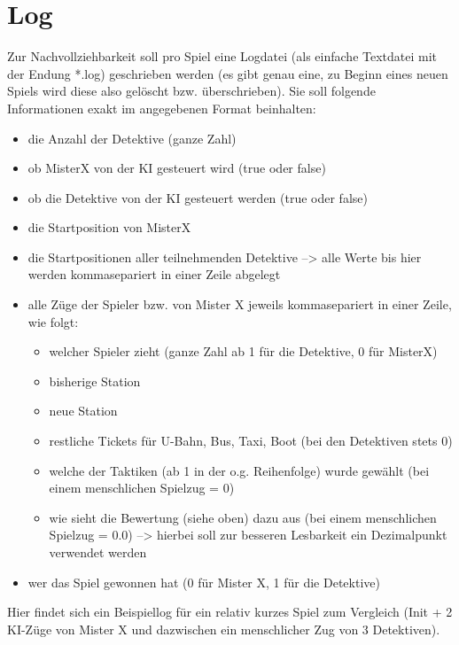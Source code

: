     \section{Log}
        Zur Nachvollziehbarkeit soll pro Spiel eine Logdatei (als einfache Textdatei mit der Endung *.log) geschrieben werden (es gibt genau eine, zu Beginn eines neuen Spiels wird diese also gelöscht bzw. überschrieben).
        Sie soll folgende Informationen exakt im angegebenen Format beinhalten:

        \begin{itemize}
            \item die Anzahl der Detektive (ganze Zahl)
            \item ob MisterX von der KI gesteuert wird (true oder false)
            \item ob die Detektive von der KI gesteuert werden (true oder false)
            \item die Startposition von MisterX
            \item die Startpositionen aller teilnehmenden Detektive
            \newline
            --> alle Werte bis hier werden kommasepariert in einer Zeile abgelegt
            \item alle Züge der Spieler bzw. von Mister X jeweils kommasepariert in einer Zeile, wie folgt:
                \begin{itemize}
                    \item welcher Spieler zieht (ganze Zahl ab 1 für die Detektive, 0 für MisterX)
                    \item bisherige Station
                    \item neue Station
                    \item restliche Tickets für U-Bahn, Bus, Taxi, Boot (bei den Detektiven stets 0)
                    \item welche der Taktiken (ab 1 in der o.g. Reihenfolge) wurde gewählt (bei einem menschlichen Spielzug = 0)
                    \item wie sieht die Bewertung (siehe oben) dazu aus (bei einem menschlichen Spielzug = 0.0)
                    \newline
                    --> hierbei soll zur besseren Lesbarkeit ein Dezimalpunkt verwendet werden
                \end{itemize}
            \item wer das Spiel gewonnen hat (0 für Mister X, 1 für die Detektive)
        \end{itemize}
        Hier findet sich ein Beispiellog für ein relativ kurzes Spiel zum Vergleich (Init + 2 KI-Züge von Mister X und dazwischen ein menschlicher Zug von 3 Detektiven). 

